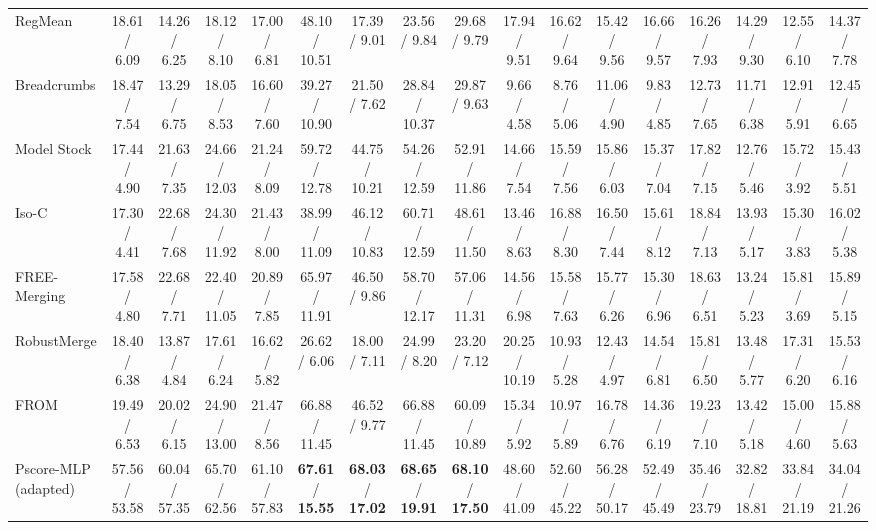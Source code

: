 \documentclass[journal,twoside,web]{ieeecolor}
\newcommand{\pub}[1]{{\color{gray}{\footnotesize{[{#1}]}}}}
\begin{document}
\begin{table}[!t]
{\begin{tabular}{l||ccc:c|ccc:c|ccc:c|ccc:c}
RegMean\pub{ICLR 2023} & 18.61 / 6.09 & 14.26 / 6.25 & 18.12 / 8.10 & 17.00 / 6.81 & 48.10 / 10.51 & 17.39 / 9.01 & 23.56 / 9.84 & 29.68 / 9.79 & 17.94 / 9.51 & 16.62 / 9.64 & 15.42 / 9.56 & 16.66 / 9.57 & 16.26 / 7.93 & 14.29 / 9.30 & 12.55 / 6.10 & 14.37 / 7.78 \\

Breadcrumbs\pub{ECCV 2024} & 18.47 / 7.54 & 13.29 / 6.75 & 18.05 / 8.53 & 16.60 / 7.60 & 39.27 / 10.90 & 21.50 / 7.62 & 28.84 / 10.37 & 29.87 / 9.63 & 9.66 / 4.58 & 8.76 / 5.06 & 11.06 / 4.90 & 9.83 / 4.85 & 12.73 / 7.65 & 11.71 / 6.38 & 12.91 / 5.91 & 12.45 / 6.65 \\


Model Stock\pub{ECCV 2024} & 17.44 / 4.90 & 21.63 / 7.35 & 24.66 / 12.03 & 21.24 / 8.09 & 59.72 / 12.78 & 44.75 / 10.21 & 54.26 / 12.59 & 52.91 / 11.86 & 14.66 / 7.54 & 15.59 / 7.56 & 15.86 / 6.03 & 15.37 / 7.04 & 17.82 / 7.15 & 12.76 / 5.46 & 15.72 / 3.92 & 15.43 / 5.51 \\

Iso-C\pub{ICML 2025} & 17.30 / 4.41 & 22.68 / 7.68 & 24.30 / 11.92 & 21.43 / 8.00 & 38.99 / 11.09 & 46.12 / 10.83 & 60.71 / 12.59 & 48.61 / 11.50 & 13.46 / 8.63 & 16.88 / 8.30 & 16.50 / 7.44 & 15.61 / 8.12 & 18.84 / 7.13 & 13.93 / 5.17 & 15.30 / 3.83 & 16.02 / 5.38 \\


FREE-Merging\pub{ICCV 2025} & 17.58 / 4.80 & 22.68 / 7.71 & 22.40 / 11.05 & 20.89 / 7.85 & 65.97 / 11.91 & 46.50 / 9.86 & 58.70 / 12.17 & 57.06 / 11.31 & 14.56 / 6.98 & 15.58 / 7.63 & 15.77 / 6.26 & 15.30 / 6.96 & 18.63 / 6.51 & 13.24 / 5.23 & 15.81 / 3.69 & 15.89 / 5.15 \\

RobustMerge\pub{NeurIPS 2025} & 18.40 / 6.38 & 13.87 / 4.84 & 17.61 / 6.24 & 16.62 / 5.82 & 26.62 / 6.06 & 18.00 / 7.11 & 24.99 / 8.20 & 23.20 / 7.12 & 20.25 / 10.19 & 10.93 / 5.28 & 12.43 / 4.97 & 14.54 / 6.81 & 15.81 / 6.50 & 13.48 / 5.77 & 17.31 / 6.20 & 15.53 / 6.16 \\


FROM\pub{AAAI 2026} & 19.49 / 6.53 & 20.02 / 6.15 & 24.90 / 13.00 & 21.47 / 8.56 & 66.88 / 11.45 & 46.52 / 9.77 & 66.88 / 11.45 & 60.09 / 10.89 & 15.34 / 5.92 & 10.97 / 5.89 & 16.78 / 6.76 & 14.36 / 6.19 & 19.23 / 7.10 & 13.42 / 5.18 & 15.00 / 4.60 & 15.88 / 5.63 \\

\hdashline
Pscore-MLP (adapted)\pub{TMI 2022} & 57.56 / 53.58 & 60.04 / 57.35 & 65.70 / 62.56 & 61.10 / 57.83 & \textbf{67.61} / \textbf{15.55} & \textbf{68.03} / \textbf{17.02} & \textbf{68.65} / \textbf{19.91} & \textbf{68.10} / \textbf{17.50} & 48.60 / 41.09 & 52.60 / 45.22 & 56.28 / 50.17 & 52.49 / 45.49 & 35.46 / 23.79 & 32.82 / 18.81 & 33.84 / 21.19 & 34.04 / 21.26 \\


\end{tabular}}
\end{table}
\end{document}
